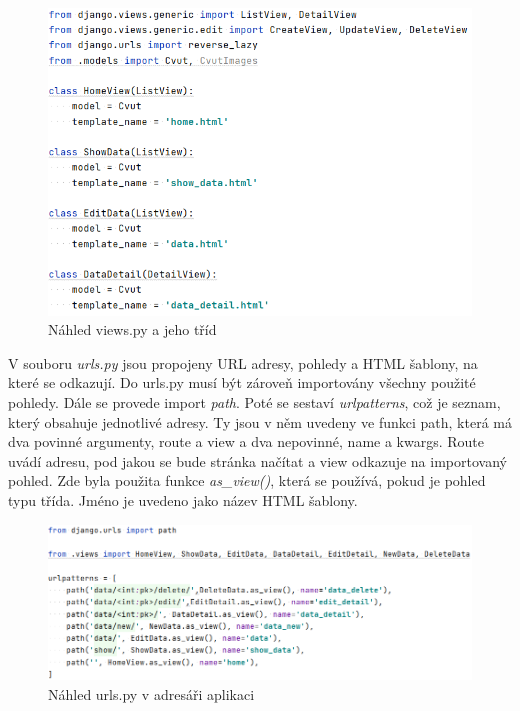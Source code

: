 \begin{figure}[H] \centering
    \includegraphics[width=350pt]{./pictures/6-nahled-views-aplikace.PNG}
    \caption[Náhled views.py a jeho tříd]{Náhled views.py a jeho tříd}
	\label{fig:Náhled views.py a jeho tříd}              
\end{figure}


V souboru \emph{urls.py} jsou propojeny URL adresy, pohledy a HTML
šablony, na které se odkazují. Do urls.py musí být zároveň importovány
všechny použité pohledy. Dále se provede import \emph{path}. Poté se
sestaví \emph{urlpatterns}, což je seznam, který obsahuje jednotlivé
adresy. Ty jsou v něm uvedeny ve funkci path, která má dva povinné
argumenty, route a view a dva nepovinné, name a kwargs. Route uvádí
adresu, pod jakou se bude stránka načítat a view odkazuje na
importovaný pohled. Zde byla použita funkce \emph{as\_view()}, která
se používá, pokud je pohled typu třída. Jméno je uvedeno jako název
HTML šablony.

\begin{figure}[H] \centering
    \includegraphics[width=450pt]{./pictures/7-urls-aplikace.PNG}
    \caption[Náhled urls.py v adresáři aplikaci]{Náhled urls.py v adresáři aplikaci}
	\label{fig:Náhled urls.py v adresáři aplikaci}              
\end{figure}


